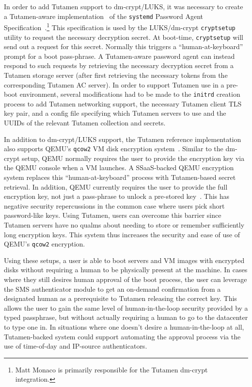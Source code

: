 In order to add Tutamen support to dm-crypt/LUKS, it was necessary to
create a Tutamen-aware implementation~\cite{src-tutamen-askpassword}
of the \texttt{systemd} Password Agent
Specification~\cite{systemd-passwordagents}.\footnote{Matt Monaco is
  primarily responsible for the Tutamen dm-crypt integration.}  This
specification is used by the LUKS/dm-crypt \texttt{cryptsetup} utility
to request the necessary decryption secret. At boot-time,
\texttt{cryptsetup} will send out a request for this secret. Normally
this triggers a ``human-at-keyboard'' prompt for a boot pass-phrase. A
Tutamen-aware password agent can instead respond to such requests by
retrieving the necessary decryption secret from a Tutamen storage
server (after first retrieving the necessary tokens from the
corresponding Tutamen AC server). In order to support Tutamen use in a
pre-boot environment, several modifications had to be made to the
\texttt{initrd} creation process to add Tutamen networking support,
the necessary Tutamen client TLS key pair, and a config file
specifying which Tutamen servers to use and the UUIDs of the relevant
Tutamen collection and secrets.

In addition to dm-crypt/LUKS support, the Tutamen reference
implementation also supports QEMU's \texttt{qcow2} VM disk encryption
system~\cite{src-qemu-tutamen}. Similar to the dm-crypt setup, QEMU
normally requires the user to provide the encryption key via the QEMU
console when a VM launches. A SSaaS-backed QEMU encryption system
replaces this ``human-at-keyboard'' process with Tutamen-based secret
retrieval. In addition, QEMU currently requires the user to provide
the full encryption key, not just a pass-phrase to unlock a pre-stored
key~\cite{berrange-qemucrypto}. This has negative security
repercussions in the common case where users pick short password-like
keys. Using Tutamen, users can overcome this barrier since Tutamen
servers have no qualms about needing to store or remember sufficiently
long encryption keys. This system thus increases the security and ease
of use of QEMU's \texttt{qcow2} encryption.

Using these setups, a user is able to boot servers and VM images with
encrypted disks without requiring a human to be physically present at
the machine. In cases where they still desires human approval of the
boot process, the user can leverage the SMS authenticator module to
get an on-demand confirmation from a designated human as a
prerequisite to Tutamen releasing the correct key. This allows the
user to gain the same level of human-in-the-loop security provided by
a typed passphrase, but without actually requiring a human to go to
the datacenter to type one in. In situations where one doesn't desire
a human-in-the-loop at all, Tutamen-backed system could support
automating the approval process via the use of time-of-day and
IP-source authenticators.

